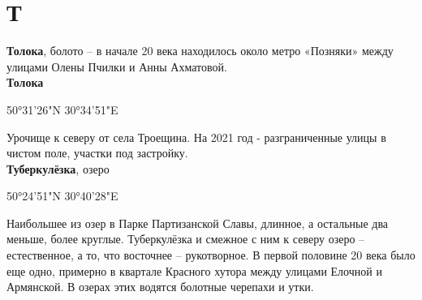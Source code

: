 \chapter*{Т}


\textbf{Толока}, болото – в начале 20 века находилось около метро «Позняки» между улицами Олены Пчилки и Анны Ахматовой.\\

\textbf{Толока}

50°31'26"N 30°34'51"E

Урочище к северу от села Троещина. На 2021 год - разграниченные улицы в чистом поле, участки под застройку.\\

\textbf{Туберкулёзка}, озеро 

50°24'51"N 30°40'28"E

Наибольшее из озер в Парке Партизанской Славы, длинное, а остальные два меньше, более круглые. Туберкулёзка и смежное с ним к северу озеро – естественное, а то, что восточнее – рукотворное. В первой половине 20 века было еще одно, примерно в квартале Красного хутора между улицами Елочной и Армянской. В озерах этих водятся болотные черепахи и утки.

